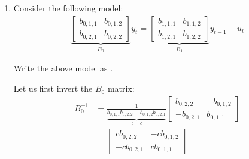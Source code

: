 \begin{enumerate}
    \item Consider the following \svarp[1]{} model:
          \begin{align*}
              \underbrace{
                  \begin{bmatrix}
                      b_{0, 1, 1} & b_{0, 1, 2} \\
                      b_{0, 2, 1} & b_{0, 2, 2}
                  \end{bmatrix}
              }_{
                  B_0
              } y_t
              = \underbrace{
                  \begin{bmatrix}
                      b_{1, 1, 1} & b_{1, 1, 2} \\
                      b_{1, 2, 1} & b_{1, 2, 2}
                  \end{bmatrix}
              }_{B_1} y_{t-1}
              + u_t
          \end{align*}

          Write the above model as \varp[1]{}.

          \begin{sol}
              Let us first invert the $B_0$ matrix:
              \begin{align*}
                  B_0^{-1} & = \underbrace{
                      \frac{1}{
                          b_{0, 1, 1} b_{0, 2, 2} - b_{0, 1, 2} b_{0, 2, 1}
                      }
                  }_{:= c}
                  \begin{bmatrix}
                      b_{0, 2, 2}  & -b_{0, 1, 2} \\
                      -b_{0, 2, 1} & b_{0, 1, 1}
                  \end{bmatrix} \\
                           & =
                  \begin{bmatrix}
                      c b_{0, 2, 2}  & -c b_{0, 1, 2} \\
                      -c b_{0, 2, 1} & c b_{0, 1, 1}
                  \end{bmatrix}
              \end{align*}


\end{sol}
\end{enumerate}
